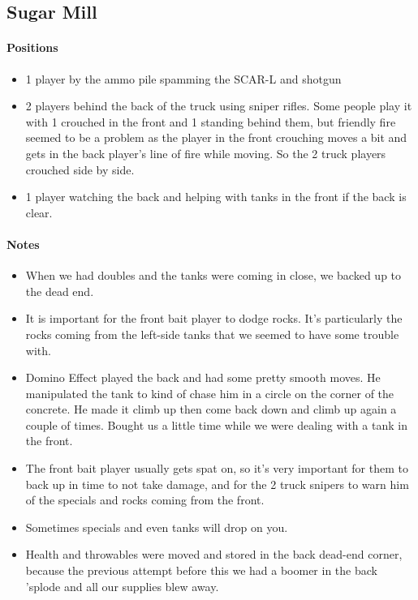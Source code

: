 \subsection{Sugar Mill}
\paragraph{Positions}
\begin{itemize}
\item 1 player by the ammo pile spamming the SCAR-L and shotgun
\item 2 players behind the back of the truck using sniper rifles. Some people play it with 1 crouched in the front and 1 standing behind them, but friendly fire seemed to be a problem as the player in the front crouching moves a bit and gets in the back player's line of fire while moving. So the 2 truck players crouched side by side.
\item 1 player watching the back and helping with tanks in the front if the back is clear.
\end{itemize}


\paragraph{Notes}
\begin{itemize}
\item When we had doubles and the tanks were coming in close, we backed up to the dead end.
\item It is important for the front bait player to dodge rocks. It's particularly the rocks coming from the left-side tanks that we seemed to have some trouble with. 
\item Domino Effect played the back and had some pretty smooth moves. He manipulated the tank to kind of chase him in a circle on the corner of the concrete. He made it climb up then come back down and climb up again a couple of times. Bought us a little time while we were dealing with a tank in the front.
\item The front bait player usually gets spat on, so it's very important for them to back up in time to not take damage, and for the 2 truck snipers to warn him of the specials and rocks coming from the front.
\item Sometimes specials and even tanks will drop on you.
\item Health and throwables were moved and stored in the back dead-end corner, because the previous attempt before this we had a boomer in the back 'splode and all our supplies blew away.
\end{itemize}

